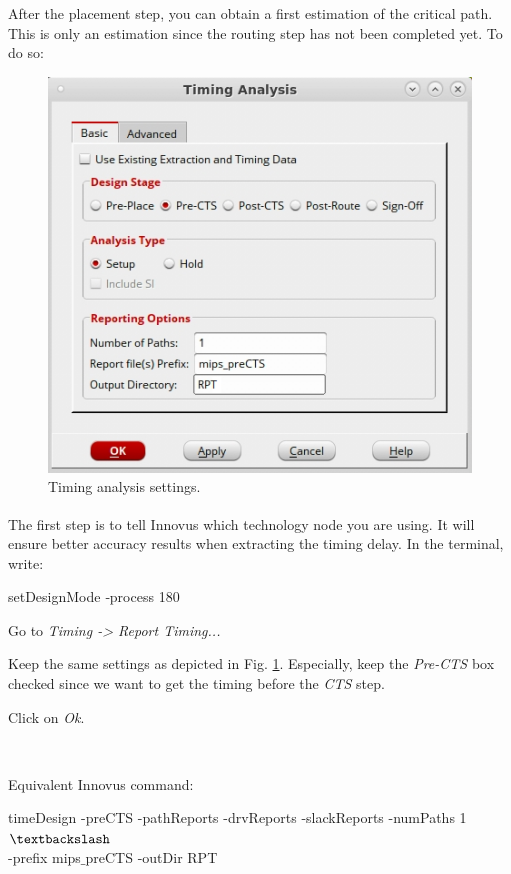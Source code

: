After the placement step, you can obtain a first estimation of the critical path. This is only an estimation since the routing step has not been completed yet. To do so:
\begin{enumerate}
	\parbox[t]{\dimexpr\textwidth-\leftmargin}{%
		\begin{figure}
			\vspace{-5mm}
			\centering
			\vspace{-\baselineskip}
			\includegraphics[scale=0.38]{figures/lab5_backend/report_timing_ino}
			\caption{Timing analysis settings.}
			\label{fig_timing}
		\end{figure}
	\item The first step is to tell Innovus\textsuperscript{\tiny\textregistered} which technology node you are using. It will ensure better accuracy results when extracting the timing delay. In the terminal, write:
			\begin{codeline}
		setDesignMode ‐process 180
	\end{codeline}
		\item Go to \textit{Timing -> Report Timing...}
		\item Keep the same settings as depicted in Fig. \ref{fig_timing}. Especially, keep the \textit{Pre-CTS} box checked since we want to get the timing before the \textit{CTS} step.
		\item Click on \textit{Ok}.
	} \\ 
\end{enumerate}
Equivalent Innovus command:
		\begin{codeline}
timeDesign -preCTS -pathReports -drvReports -slackReports -numPaths 1 $\textbackslash$\\-prefix mips$\_$preCTS -outDir RPT
		\end{codeline}

